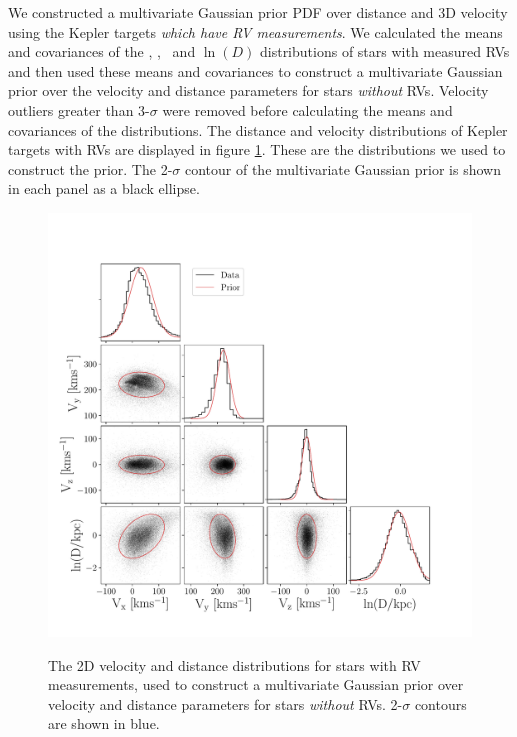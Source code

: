 We constructed a multivariate Gaussian prior PDF over distance and 3D velocity
using the Kepler targets {\it which have RV measurements}.
We calculated the means and covariances of the \vx, \vy, \vz\ and $\ln(D)$
distributions of stars with measured RVs and then used these means and
covariances to construct a multivariate Gaussian prior over the velocity and
distance parameters for stars {\it without} RVs.
Velocity outliers greater than 3-$\sigma$ were removed before calculating the
means and covariances of the distributions.
The distance and velocity distributions of Kepler targets with RVs are
displayed in figure \ref{fig:prior_distributions_2D}.
These are the distributions we used to construct the prior.
The 2-$\sigma$ contour of the multivariate Gaussian prior is shown in each
panel as a black ellipse.
\begin{figure}[ht!]
\caption{
The 2D velocity and distance distributions for stars with RV measurements,
    used to construct a multivariate Gaussian prior over velocity and
    distance parameters for stars {\it without} RVs.
2-$\sigma$ contours are shown in blue.
}
  \centering
    \includegraphics[width=1\textwidth]{prior_distributions_2D}
\label{fig:prior_distributions_2D}
\end{figure}


